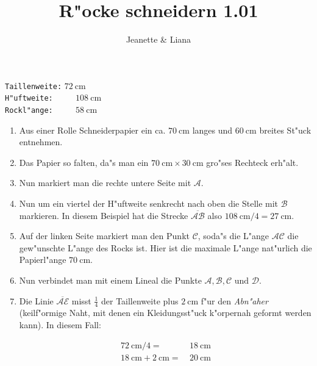\documentclass{scrartcl}
\begin{document}
  \title{R"ocke schneidern 1.01}
  \author{Jeanette \& Liana}
  \date{}
\maketitle

  
\noindent \mbox{} \hspace{1cm} \texttt{Taillenweite:} $ \SI{72}{\centi\meter} $ \\
\mbox{} \hspace{1cm} \texttt{H"uftweite:} ~~~~ $ \SI{108}{\centi\meter}$ \\
\mbox{} \hspace{1cm} \texttt{Rockl"ange:} ~~~~ $ \SI{58}{\centi\meter} $ 

\begin{enumerate}
  \item Aus einer Rolle Schneiderpapier ein ca. $\SI{70}{\centi\meter}$ langes
    und $\SI{60}{\centi\meter}$ breites St"uck entnehmen.

  \item Das Papier so falten, da"s man ein $\SI{70}{\centi\meter}\times
    \SI{30}{\centi\meter}$ gro"ses Rechteck erh"alt.
 
  \item Nun markiert man die rechte untere Seite mit $\mathcal{A}$.
 
  \item Nun um ein viertel der H"uftweite senkrecht nach oben die Stelle mit 
    $\mathcal{B}$ markieren. In diesem Beispiel hat die Strecke
    $\overline{\mathcal{AB}}$ also $\SI{108}{\centi\meter}/4 = 
    \SI{27}{\centi\meter}$.
 
  \item Auf der linken Seite markiert man den Punkt $\mathcal{C}$, soda"s
    die L"ange $\mathcal{AC}$ die gew"unschte L"ange des Rocks ist. Hier ist
    die maximale L"ange nat"urlich die Papierl"ange $\SI{70}{\centi\meter}$.
  
  \item Nun verbindet man mit einem Lineal die Punkte 
    $\mathcal{A,B,C} \text{ und } \mathcal{D}$.
  
  \item Die Linie $\overline{\mathcal{AE}}$ misst $\frac{1}{4}$ der Taillenweite
    plus $\SI{2}{\centi\meter}$ f"ur den \emph{Abn"aher} (keilf"ormige Naht,
    mit  denen ein Kleidungsst"uck k"orpernah geformt werden kann). In diesem
    Fall: \vspace{-2em}

      \begin{align*}
	\SI{72}{\centi\meter}/4=&~\SI{18}{\centi\meter} \\
	\SI{18}{\centi\meter}+\SI{2}{\centi\meter}=&~\SI{20}{\centi\meter}
	\label{abnaeher}
      \end{align*}


\end{enumerate}
\end{document}
